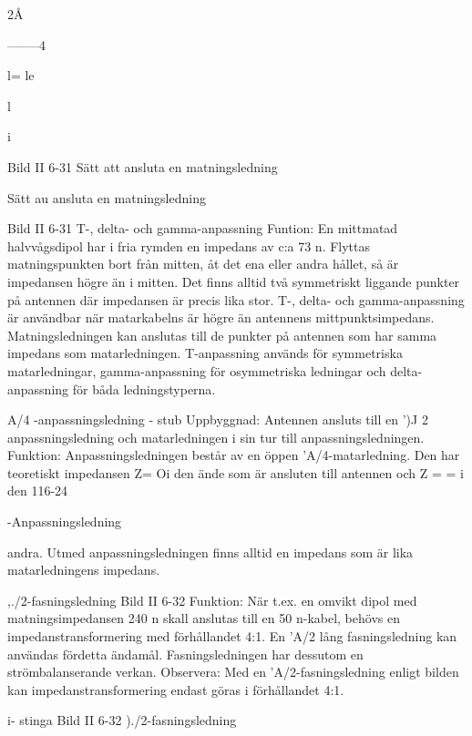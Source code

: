 \documentclass[a4paper,twoside,twocolumn,openright]{book}
\begin{document}
{{{{{2Å

--------4

l= le~

l

i

Bild II 6-31 Sätt att ansluta en matningsledning

Sätt au ansluta en matningsledning

Bild II 6-31
T-, delta- och gamma-anpassning
Funtion: En mittmatad halvvågsdipol har
i fria rymden en impedans av c:a 73 n.
Flyttas matningspunkten bort från mitten, åt det ena eller andra hållet, så är
impedansen högre än i mitten.
Det finns alltid två symmetriskt liggande
punkter på antennen där impedansen är
precis lika stor.
T-, delta- och gamma-anpassning är användbar när matarkabelns
är högre än antennens mittpunktsimpedans. Matningsledningen kan anslutas till de punkter
på antennen som har samma impedans
som matarledningen. T-anpassning används för symmetriska matarledningar, gamma-anpassning för osymmetriska ledningar
och delta-anpassning för båda ledningstyperna.

A/4 -anpassningsledning - stub
Uppbyggnad: Antennen ansluts till en ')J
2 anpassningsledning och matarledningen
i sin tur till anpassningsledningen.
Funktion: Anpassningsledningen består
av en öppen 'A/4-matarledning. Den har
teoretiskt impedansen Z= Oi den ände som
är ansluten till antennen och Z = = i den
116-24

-Anpassningsledning

andra. Utmed anpassningsledningen finns
alltid en impedans som är lika matarledningens impedans.

},./2-fasningsledning
Bild II 6-32
Funktion: När t.ex. en omvikt dipol med
matningsimpedansen 240 n skall anslutas
till en 50 n-kabel, behövs en impedanstransformering med förhållandet 4:1. En 'A/2
lång fasningsledning kan användas fördetta
ändamål. Fasningsledningen har dessutom
en strömbalanserande verkan.
Observera: Med en 'A/2-fasningsledning
enligt bilden kan impedanstransformering
endast göras i förhållandet 4:1.

i- stinga
Bild II 6-32 )./2-fasningsledning

}}}}
\end{document}
